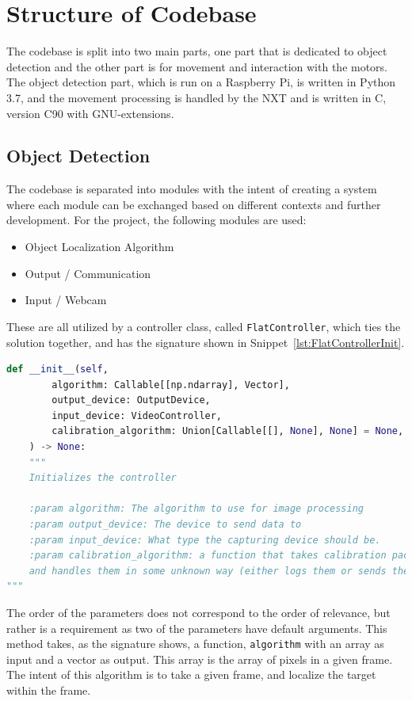 \section{Structure of Codebase}
The codebase is split into two main parts, one part that is dedicated to object detection and the other part is for movement and interaction with the motors.
The object detection part, which is run on a Raspberry Pi, is written in Python 3{.}7, and the movement processing is handled by the NXT and is written in C, version C90 with GNU-extensions.


\subsection{Object Detection}
The codebase is separated into modules with the intent of creating a system where each module can be exchanged based on different contexts and further development.
For the project, the following modules are used:
\begin{itemize}
	\item Object Localization Algorithm
	\item Output / Communication
	\item Input / Webcam
\end{itemize}

These are all utilized by a controller class, called \texttt{FlatController}, which ties the solution together, and has the signature shown in Snippet~\ref{lst:FlatControllerInit}.
\begin{lstlisting}[language=Python,label={lst:FlatControllerInit},caption={Initialization method of the \texttt{FlatController} class}]
def __init__(self,
		algorithm: Callable[[np.ndarray], Vector],
		output_device: OutputDevice,
		input_device: VideoController,
		calibration_algorithm: Union[Callable[[], None], None] = None,
	) -> None:
	"""
	Initializes the controller
	
	:param algorithm: The algorithm to use for image processing
	:param output_device: The device to send data to
	:param input_device: What type the capturing device should be.
	:param calibration_algorithm: a function that takes calibration packages,
	and handles them in some unknown way (either logs them or sends them back)
"""

\end{lstlisting}

The order of the parameters does not correspond to the order of relevance, but rather is a requirement as two of the parameters have default arguments.
This method takes, as the signature shows, a function, \texttt{algorithm} with an array as input and a vector as output.
This array is the array of pixels in a given frame.
The intent of this algorithm is to take a given frame, and localize the target within the frame.

